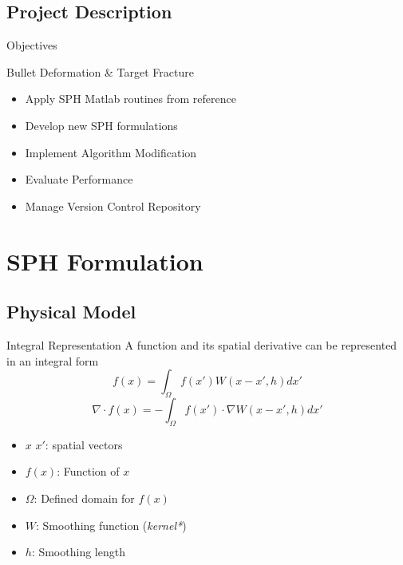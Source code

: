 \documentclass[10pt]{beamer}
\begin{document}
\subsection{Project Description}
\begin{frame}{Objectives}
\begin{Large}
\begin{center}
   Bullet Deformation \& Target Fracture
\end{center}
\end{Large}
   \begin{itemize}
   \item Apply SPH Matlab routines from reference
   \item Develop new SPH formulations
   \item Implement Algorithm Modification
   \item Evaluate Performance
   \item Manage Version Control Repository
   \end{itemize}
\end{frame}



\section{SPH Formulation}

\subsection{Physical Model}

\begin{frame}{Integral Representation}
A function and its spatial derivative can be represented in an integral form
$$f(x)=\int_{\Omega}{f(x')W(x-x',h)dx'}$$
$$\nabla\cdot f(x)=-\int_{\Omega}{f(x')\cdot\nabla W(x-x',h)dx'}$$
\begin{itemize}
\item $x$ $x'$: spatial vectors
\item $f(x)$: Function of $x$
\item $\Omega$: Defined domain for $f(x)$
\item $W$: Smoothing function (\textit{kernel*})
\item $h$: Smoothing length
\end{itemize}
\end{frame}
\end{document}
